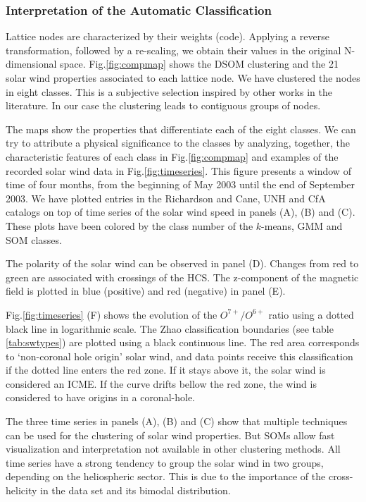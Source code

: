 \documentclass[utf8]{frontiersSCNS} %
\begin{document}
\subsubsection{Interpretation of the Automatic Classification}

Lattice nodes are characterized by their weights (code). Applying a reverse transformation, followed by a re-scaling, we obtain their values in the original N-dimensional space. Fig.\ref{fig:compmap} shows the DSOM clustering and the 21 solar wind properties associated to each lattice node. We have clustered the nodes in eight classes. This is a subjective selection inspired by other works in the literature. In our case the clustering leads to contiguous groups of nodes.

The maps show the properties that differentiate each of the eight classes. We can try to attribute a physical significance to the classes by analyzing, together, the characteristic features of each class in Fig.\ref{fig:compmap} and examples of the recorded solar wind data in Fig.\ref{fig:timeseries}. This figure presents a window of time of four months, from the beginning of May 2003 until the end of September 2003. We have plotted entries in the Richardson and Cane, UNH and CfA catalogs on top of time series of the solar wind speed in panels (A), (B) and (C). These plots have been colored by the class number of the $k$-means, GMM and SOM classes.

The polarity of the solar wind can be observed in panel (D). Changes from red to green are associated with crossings of the HCS. The z-component of the magnetic field is plotted in blue (positive) and red (negative) in panel (E).

Fig.\ref{fig:timeseries} (F) shows the evolution of the $O^{7+}/O^{6+}$ ratio using a dotted black line in logarithmic scale. The Zhao classification boundaries (see table \ref{tab:swtypes}) are plotted using a black continuous line. The red area corresponds to `non-coronal hole origin' solar wind, and data points receive this classification if the dotted line enters the red zone. If it stays above it, the solar wind is considered an ICME. If the curve drifts bellow the red zone, the wind is considered to have origins in a coronal-hole.

The three time series in panels (A), (B) and (C) show that multiple techniques can be used for the clustering of solar wind properties. But SOMs allow fast visualization and interpretation not available in other clustering methods. All time series have a strong tendency to group the solar wind in two groups, depending on the heliospheric sector. This is due to the importance of the cross-helicity in the data set and its bimodal distribution.
\end{document}
